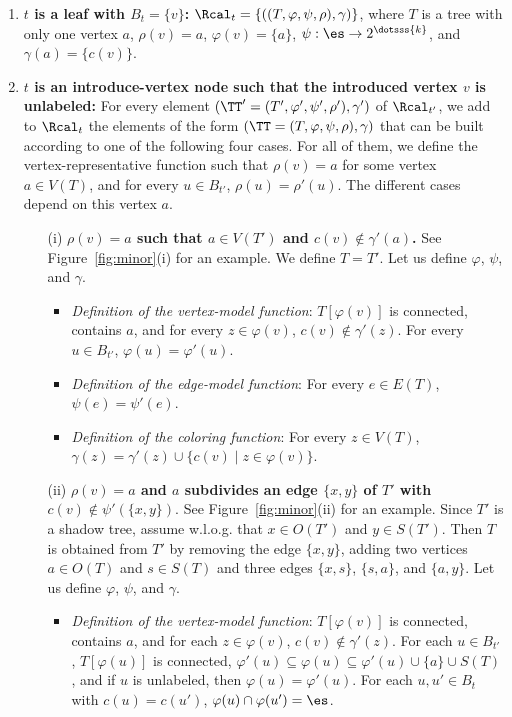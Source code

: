 \begin{enumerate}
\item {\bf $t$ is a leaf with $B_t=\{v\}$:} $\Rcal_{t}= \{ ((T,\varphi, \psi, \rho),\gamma) \}$, where $T$ is a tree with only one vertex $a$, $\rho(v) = a$, $\varphi(v) = \{a\}$, $\psi : \es \rightarrow 2^{\dotsss{k}}$, and $\gamma(a) = \{c(v)\}$.

\medskip
\item {\bf $t$ is an introduce-vertex node such that the introduced vertex $v$  is unlabeled:}
For every element $(\TT' = (T',\varphi',\psi',\rho'),\gamma')$ of $\Rcal_{t'}$,
we add  to $\Rcal_t$ the elements  of the form $(\TT = (T,\varphi,\psi,\rho),\gamma)$ that can be built according to one of the following four cases. For all of them, we define the vertex-representative function such that  $\rho(v)= a$ for some vertex $a \in V(T)$, and  for every $u \in B_{t'}$, $\rho(u) = \rho'(u)$. The different cases depend on this vertex $a$.


\medskip
\begin{itemize}
\item[(i)] {\bf $\rho(v) = a$ such that  $a \in V(T')$ and $c(v) \not \in \gamma'(a)$.} See Figure~\ref{fig:minor}(i) for an example.  We define $T = T'$.  Let us define  $\varphi$, $\psi$, and $\gamma$.
\begin{itemize}
\item \emph{Definition of the vertex-model function}: $T[\varphi(v)]$ is connected, contains $a$,
  and for every $z \in \varphi(v)$, $c(v) \not \in \gamma'(z)$. For every $u \in B_{t'}$, $\varphi(u) = \varphi'(u)$.
\item \emph{Definition of the edge-model function}: For every $e \in E(T)$, $\psi(e) = \psi'(e)$.
\item\emph{ Definition of the coloring function}: For every $z \in V(T)$, $\gamma(z) = \gamma'(z) \cup \{c(v) \mid  z \in \varphi(v)\}$.
\end{itemize}

\medskip
\item[(ii)] \textbf{$\rho(v)=a$  and $a$ subdivides an edge $\{x,y\}$ of $T'$ with $c(v) \not \in \psi'(\{x,y\})$}. See Figure~\ref{fig:minor}(ii) for an example.
Since $T'$ is a shadow tree, assume w.l.o.g. that $x \in O(T')$ and $y \in S(T')$.
Then $T$ is obtained from $T'$ by removing the edge $\{x,y\}$, adding two vertices $a\in O(T)$ and $s \in S(T)$ and three edges $\{x,s\}$, $\{s,a\}$, and $\{a,y\}$. Let us define  $\varphi$, $\psi$, and $\gamma$.
\begin{itemize}
\item \emph{Definition of the vertex-model function}: $T[\varphi(v)]$ is connected, contains $a$,
  and for each $z \in \varphi(v)$, $c(v) \not \in \gamma'(z)$.
  For each $u \in B_{t'}$, $T[\varphi(u)]$ is connected,  $\varphi'(u) \subseteq \varphi(u) \subseteq \varphi'(u) \cup \{a\} \cup S(T)$, and
 if $u$ is unlabeled, then $\varphi(u) = \varphi'(u)$.
For each $u,u' \in B_{t}$ with $c(u) = c(u')$, $\varphi(u) \cap \varphi(u') = \es$.


\end{itemize}
\end{itemize}
\end{enumerate}
